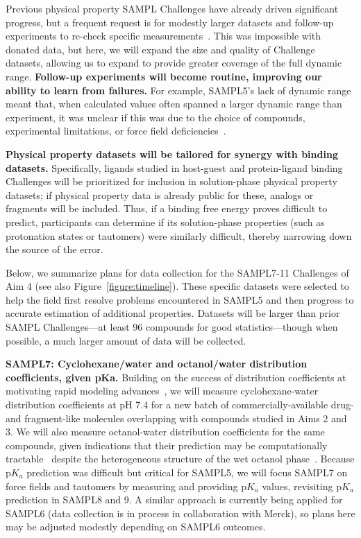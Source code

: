 \documentclass[11pt]{article}
\begin{document}
Previous physical property SAMPL Challenges have already driven significant progress, but a frequent request is for modestly larger datasets and follow-up experiments to re-check specific measurements~\cite{Mobley:2017:eScholarship}. 
This was impossible with donated data, but here, we will expand the size and quality of Challenge datasets, allowing us to expand to provide greater coverage of the full dynamic range. 
\textbf{Follow-up experiments will become routine, improving our ability to learn from failures.}
For example, SAMPL5's lack of dynamic range meant that, when calculated values often spanned a larger dynamic range than experiment, it was unclear if this was due to the choice of compounds, experimental limitations, or force field deficiencies~\cite{rustenburg_measuring_2016, Bannan:2016:JComputAidedMolDes, paranahewage_predicting_2016, klamt_prediction_2016}.  

{\bf Physical property datasets will be tailored for synergy with binding datasets.}
Specifically, ligands studied in host-guest and protein-ligand binding Challenges will be prioritized for inclusion in solution-phase physical property datasets; if physical property data is already public for these, analogs or fragments will be included. 
Thus, if a binding free energy proves difficult to predict, participants can determine if its solution-phase properties (such as protonation states or tautomers) were similarly difficult, thereby narrowing down the source of the error.

Below, we summarize plans for data collection for the SAMPL7-11 Challenges of Aim 4 (see also Figure~\ref{figure:timeline}).
These specific datasets were selected to help the field first resolve problems encountered in SAMPL5 and then progress to accurate estimation of additional properties.
Datasets will be larger than prior SAMPL Challenges---at least 96 compounds for good statistics---though when possible, a much larger amount of data will be collected.

\textbf{SAMPL7: Cyclohexane/water and octanol/water distribution coefficients, given pKa.}
Building on the success of distribution coefficients at motivating rapid modeling advances~\cite{Bannan:2016:JComputAidedMolDes}, we will measure cyclohexane-water distribution coefficients at pH 7.4 for a new batch of commercially-available drug- and fragment-like molecules overlapping with compounds studied in Aims 2 and 3.
We will also measure octanol-water distribution coefficients for the same compounds, given indications that their prediction may be computationally tractable~\cite{Bhatnagar:2013:PhysicalChemistryChemicalPhysics, bannan_calculating_2016} despite the heterogeneous structure of the wet octanol phase~\cite{Kollman:1996:AccountsofChemicalResearch}.
Because p$K_a$ prediction was difficult but critical for SAMPL5, we will focus SAMPL7 on force fields and tautomers by measuring and providing p$K_a$ values, revisiting p$K_a$ prediction in SAMPL8 and 9.
A similar approach is currently being applied for SAMPL6 (data collection is in process in collaboration with Merck), so plans here may be adjusted modestly depending on SAMPL6 outcomes.
\end{document}
